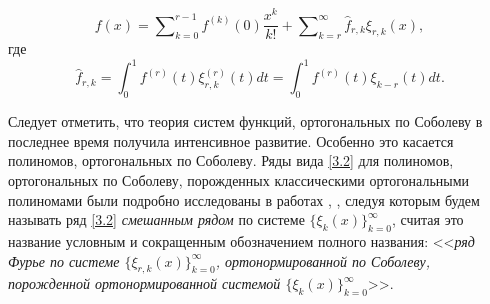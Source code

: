 \documentclass{article}
\numberwithin{equation}{section}
\theoremstyle{plain}
\theoremstyle{definition}
\begin{document}
\begin{fulltext}
  \begin{equation}\label{3.6}
f(x)= \sum\nolimits_{k=0}^{r-1} f^{(k)}(0)\frac{x^k}{k!}+ \sum\nolimits_{k=r}^\infty \hat f_{r,k}\xi_{r,k}(x),
\end{equation}
где
  \begin{equation}\label{3.7}
\hat f_{r,k}=\int_0^1 f^{(r)}(t) \xi^{(r)}_{r,k}(t)dt=\int_0^1 f^{(r)}(t) \xi_{k-r}(t)dt.
\end{equation}

Следует отметить, что теория  систем функций, ортогональных по Соболеву в последнее время получила \cite{SharIzv2018}  интенсивное развитие. Особенно это касается \cite{MarcelXu} полиномов, ортогональных по Соболеву. Ряды вида \eqref{3.2} для полиномов, ортогональных по Соболеву, порожденных классическими ортогональными полиномами были подробно  исследованы в работах \cite{Shar17}, \cite{Shar13}, следуя которым  будем  называть ряд \eqref{3.2} {\it смешанным рядом} по  системе $\{\xi_{k}(x)\}_{k=0}^\infty$, считая это название условным и сокращенным обозначением полного названия: <<{\it ряд Фурье по системе  $\{\xi_{r,k}(x)\}_{k=0}^\infty$, ортонормированной по Соболеву, порожденной ортонормированной системой $\{\xi_{k}(x)\}_{k=0}^\infty$}>>.


\end{fulltext}
\end{document}
